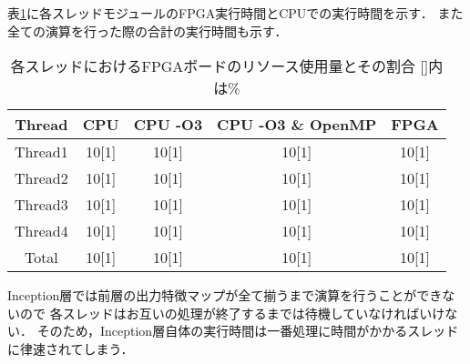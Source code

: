 {表\ref{table:exec_time}に各スレッドモジュールのFPGA実行時間とCPUでの実行時間を示す．
また全ての演算を行った際の合計の実行時間も示す．

\begin{table}[p]
    \begin{center}
    \caption{各スレッドにおけるFPGAボードのリソース使用量とその割合 []内は\%}
    \label{table:exec_time}
    \begin{tabular}{|c|c|c|c|c|} \hline
    \multicolumn{1}{|c|}{Thread} & \multicolumn{1}{|c|}{CPU} & \multicolumn{1}{|c|}{CPU -O3} & \multicolumn{1}{|c|}{CPU -O3 \& OpenMP} & \multicolumn{1}{|c|}{FPGA} \\ \hline \hline
    Thread1       & 10[1] & 10[1] & 10[1] & 10[1] \\ \hline
    Thread2       & 10[1] & 10[1] & 10[1] & 10[1] \\ \hline
    Thread3       & 10[1] & 10[1] & 10[1] & 10[1] \\ \hline
    Thread4       & 10[1] & 10[1] & 10[1] & 10[1] \\ \hline
    Total       & 10[1] & 10[1] & 10[1] & 10[1] \\ \hline
    \end{tabular}
    \end{center}
\end{table}

Inception層では前層の出力特徴マップが全て揃うまで演算を行うことができないので
各スレッドはお互いの処理が終了するまでは待機していなければいけない．
そのため，Inception層自体の実行時間は一番処理に時間がかかるスレッドに律速されてしまう．
}
